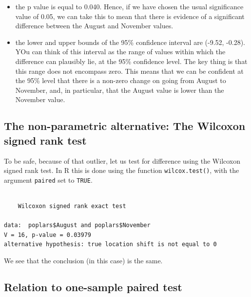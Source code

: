 \documentclass[
  letterpaper,
  DIV=11,
  numbers=noendperiod]{scrreprt}
\newenvironment{Shaded}{\begin{snugshade}}{\end{snugshade}}
\newcommand{\AttributeTok}[1]{\textcolor[rgb]{0.40,0.45,0.13}{#1}}
\newcommand{\ConstantTok}[1]{\textcolor[rgb]{0.56,0.35,0.01}{#1}}
\newcommand{\FunctionTok}[1]{\textcolor[rgb]{0.28,0.35,0.67}{#1}}
\newcommand{\NormalTok}[1]{\textcolor[rgb]{0.00,0.23,0.31}{#1}}
\newcommand{\SpecialCharTok}[1]{\textcolor[rgb]{0.37,0.37,0.37}{#1}}
\providecommand{\tightlist}{%
  \setlength{\itemsep}{0pt}\setlength{\parskip}{0pt}}\usepackage{longtable,booktabs,array}
\begin{document}
\begin{itemize}
\tightlist
\item
  the p value is equal to 0.040. Hence, if we have chosen the usual
  significance value of 0.05, we can take this to mean that there is
  evidence of a significant difference between the August and November
  values.
\item
  the lower and upper bounds of the 95\% confidence interval are (-9.52,
  -0.28). YOu can think of this interval as the range of values within
  which the difference can plausibly lie, at the 95\% confidence level.
  The key thing is that this range does not encompass zero. This means
  that we can be confident at the 95\% level that there is a non-zero
  change on going from August to November, and, in particular, that the
  August value is lower than the November value.
\end{itemize}

\subsection{The non-parametric alternative: The Wilcoxon signed rank
test}\label{the-non-parametric-alternative-the-wilcoxon-signed-rank-test}

To be safe, because of that outlier, let us test for difference using
the Wilcoxon signed rank test. In R this is done using the function
\texttt{wilcox.test()}, with the argument \texttt{paired} set to
\texttt{TRUE}.

\begin{Shaded}
\end{Shaded}

\begin{verbatim}

    Wilcoxon signed rank exact test

data:  poplars$August and poplars$November
V = 16, p-value = 0.03979
alternative hypothesis: true location shift is not equal to 0
\end{verbatim}

We see that the conclusion (in this case) is the same.

\subsection{Relation to one-sample paired
test}\label{relation-to-one-sample-paired-test}
\end{document}
